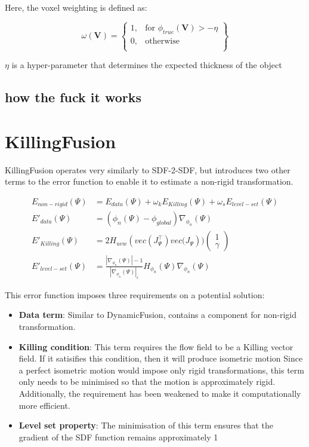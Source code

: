 \documentclass[12pt,twoside]{report}
\begin{document}
Here, the voxel weighting is defined as:

\[
    \omega(\textbf{V}) = \left\{\begin{array}{lr}
    1, & \text{for } \phi_{true}(\textbf{V}) > - \eta\\
    0, & \text{otherwise}\\
    \end{array}\right\}
\]

$\eta$ is a hyper-parameter that determines the expected thickness of the object 

\subsection{how the fuck it works}


\section{KillingFusion}

KillingFusion operates very similarly to SDF-2-SDF, but introduces two other terms to the error function to enable it to estimate a non-rigid transformation.

\begin{align*}
E_{non-rigid}(\Psi) &= E_{data}(\Psi) + \omega_kE_{Killing}(\Psi) + \omega_sE_{level-set}(\Psi)\\
E'_{data}(\Psi) &= (\phi_n(\Psi) - \phi_{global}) \nabla_{\phi_n}(\Psi)\\
E'_{Killing}(\Psi) &= 2H_{uvw}(vec(J^{\top}_{\Psi}) vec\big(J_{\Psi})\big)\begin{pmatrix}1\\\gamma \end{pmatrix}\\
E'_{level-set}(\Psi) &= \frac{|\nabla_{\phi_n}(\Psi)| - 1}{|\nabla_{\phi_n}(\Psi)|_\epsilon}H_{\phi_n}(\Psi)\nabla_{\phi_n}(\Psi)
\end{align*}

This error function imposes three requirements on a potential solution:
\begin{itemize}
\item \textbf{Data term}: Similar to DynamicFusion, contains a component for non-rigid transformation.
\item \textbf{Killing condition}: This term requires the flow field to be a Killing vector field. If it satisifies this condition, then it will produce isometric motion Since a perfect isometric motion would impose only rigid transformations, this term only needs to be minimised so that the motion is approximately rigid. Additionally, the requirement has been weakened to make it computationally more efficient.
\item \textbf{Level set property}: The minimisation of this term ensures that the gradient of the SDF function remains approximately 1
\end{itemize}
\end{document}
